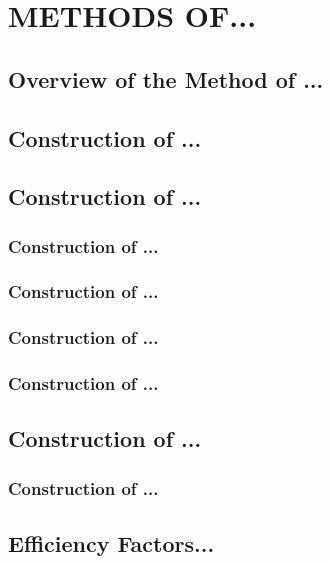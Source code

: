 \chapter{METHODS OF...}

\section{Overview of the Method of ...}

\section{Construction of ...}

\section{Construction of ...}

\subsection{Construction of ...}

\subsection{Construction of ...}

\subsection{Construction of ...}

\subsection{Construction of ...}

\section{Construction of ...}


\subsection{Construction of ...}


\section{Efficiency Factors... }
